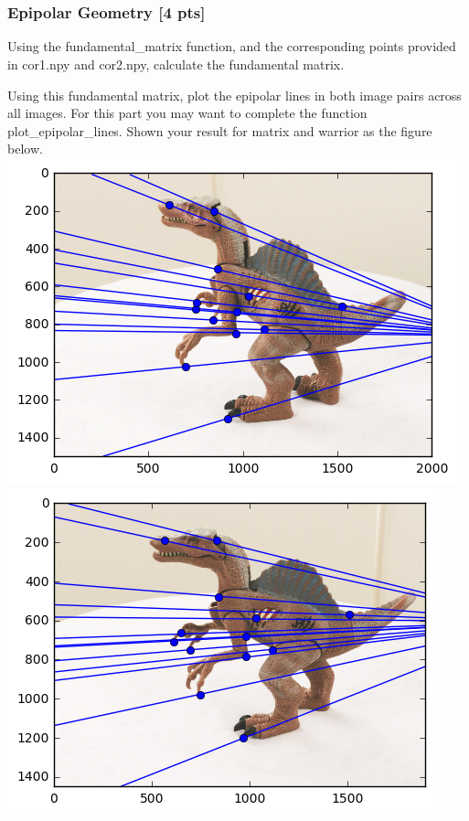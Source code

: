 \documentclass[11pt]{article}
\makeatletter
\def\maxwidth{\ifdim\Gin@nat@width>\linewidth\linewidth
    \else\Gin@nat@width\fi}
\let\Oldincludegraphics\includegraphics
\renewcommand{\includegraphics}[1]{\Oldincludegraphics[width=.8\maxwidth]{#1}}
\makeatother
\begin{document}
    \begin{Verbatim}[commandchars=\\\{\}]



    \end{Verbatim}

    \hypertarget{epipolar-geometry-4-pts}{%
\subsubsection{Epipolar Geometry {[}4
pts{]}}\label{epipolar-geometry-4-pts}}

Using the fundamental\_matrix function, and the corresponding points
provided in cor1.npy and cor2.npy, calculate the fundamental matrix.

Using this fundamental matrix, plot the epipolar lines in both image
pairs across all images. For this part you may want to complete the
function plot\_epipolar\_lines. Shown your result for matrix and warrior
as the figure below. \includegraphics{fig/dinoEpi1.png}
\includegraphics{fig/dinoEpi2.png}
\end{document}

